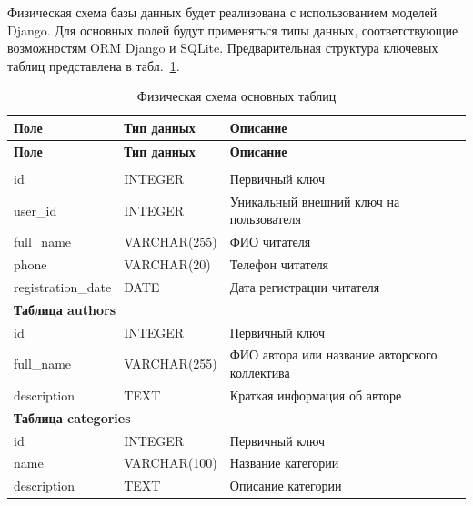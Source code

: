 Физическая схема базы данных будет реализована с использованием моделей Django.
Для основных полей будут применяться типы данных, соответствующие возможностям
ORM Django и SQLite. Предварительная структура ключевых таблиц представлена в
табл.~\ref{tab:physical_schema}.

{
\coursetablesetup
\setlength{\LTleft}{0pt}
\setlength{\LTright}{0pt}

\begin{longtable}{|
p{}|
p{}|
p{}|}
    \caption{Физическая схема основных таблиц}
    \label{tab:physical_schema} \\

    \hline
    \textbf{Поле} & \textbf{Тип данных} & \textbf{Описание} \\ \hline
    \endfirsthead

    \tabcont{\ref{tab:physical_schema}}
    \textbf{Поле} & \textbf{Тип данных} & \textbf{Описание} \\ \hline
    \endhead

    \hline
    \endfoot

    \multicolumn{3}{|l|}{\textbf{Таблица readers}} \\ \hline
    id & INTEGER & Первичный ключ \\ \hline
    user\_id & INTEGER & Уникальный внешний ключ на пользователя \\ \hline
    full\_name & VARCHAR(255) & ФИО читателя \\ \hline
    phone & VARCHAR(20) & Телефон читателя \\ \hline
    registration\_date & DATE & Дата регистрации читателя \\ \hline

    \multicolumn{3}{|l|}{\textbf{Таблица authors}} \\ \hline
    id & INTEGER & Первичный ключ \\ \hline
    full\_name & VARCHAR(255) & ФИО автора или название авторского коллектива \\ \hline
    description & TEXT & Краткая информация об авторе \\ \hline

    \multicolumn{3}{|l|}{\textbf{Таблица categories}} \\ \hline
    id & INTEGER & Первичный ключ \\ \hline
    name & VARCHAR(100) & Название категории \\ \hline
    description & TEXT & Описание категории \\ \hline


\end{longtable}}
